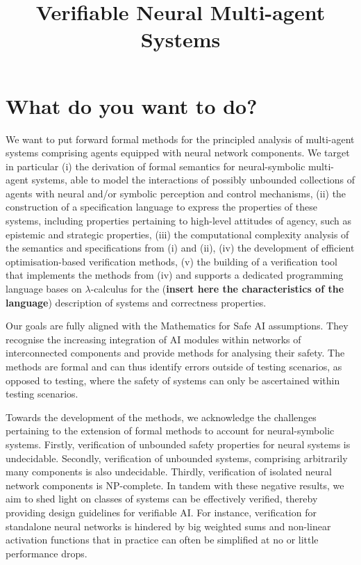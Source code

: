 \documentclass[11pt]{article}
\title{Verifiable Neural Multi-agent Systems}
\date{}
\begin{document}
\maketitle

\section{What do you want to do?}


We want to put forward formal methods for the principled
analysis of multi-agent systems comprising agents equipped
with neural network components. We target in particular (i)
the derivation of formal semantics for neural-symbolic
multi-agent systems, able to model the interactions of
possibly unbounded collections of agents with neural and/or
symbolic perception and control mechanisms, (ii) the
construction of a specification language to express the
properties of these systems, including properties pertaining
to high-level attitudes of agency, such as epistemic and
strategic properties, (iii) the computational complexity
analysis of the semantics and specifications from (i) and
(ii), (iv) the development of efficient
optimisation-based verification methods, (v) the building of
a verification tool that implements the methods from (iv)
and supports a dedicated programming language bases on
$\lambda$-calculus for the ({\bf insert here the
characteristics of the language}) description of systems and
correctness properties.

Our goals are fully aligned with the Mathematics for Safe AI
assumptions.  They recognise the increasing integration of
AI modules within networks of interconnected components and
provide methods for analysing their safety.  The methods are
formal and  can thus identify errors outside of testing
scenarios, as opposed to testing, where the safety of
systems can only be ascertained within testing scenarios.

Towards the development of the methods, we acknowledge the
challenges pertaining to the extension of formal methods to account
for neural-symbolic systems. Firstly, verification of
unbounded safety properties for neural systems is
undecidable. Secondly, verification of unbounded systems,
comprising arbitrarily many components is also undecidable.
Thirdly, verification of isolated neural network components
is NP-complete. In tandem with these negative results, we
aim to shed light on classes of systems can be effectively
verified, thereby providing design guidelines for verifiable
AI. For instance, verification for standalone neural
networks is hindered by big weighted sums and non-linear
activation functions that in practice can often be
simplified at no or little performance drops. 
\end{document}
